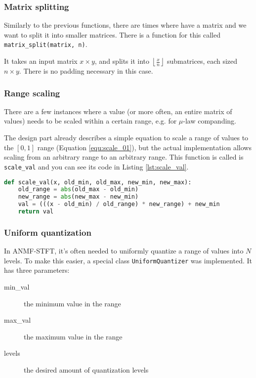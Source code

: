 \subsubsection{Matrix splitting}
Similarly to the previous functions, there are times where have a matrix and we want to split it into smaller matrices. There is a function for this called \verb|matrix_split(matrix, n)|.

It takes an input matrix $x \times y$, and splits it into $\left\lfloor \frac{x}{n} \right\rfloor$ submatrices, each sized $n \times y$. There is no padding necessary in this case.

\subsubsection{Range scaling}
There are a few instances where a value (or more often, an entire matrix of values) needs to be scaled within a certain range, e.g. for $\mu$-law companding.

The design part already describes a simple equation to scale a range of values to the $[0,1]$ range (Equation \ref{equ:scale_01}), but the actual implementation allows scaling from an arbitrary range to an arbitrary range. This function is called is \verb|scale_val| and you can see its code in Listing \ref{lst:scale_val}.

\begin{lstlisting}[caption={Function for scaling value ranges}, label={lst:scale_val}, language=Python]
def scale_val(x, old_min, old_max, new_min, new_max):
	old_range = abs(old_max - old_min)
	new_range = abs(new_max - new_min)
	val = (((x - old_min) / old_range) * new_range) + new_min
	return val
\end{lstlisting}

\subsubsection{Uniform quantization}
In ANMF-STFT, it's often needed to uniformly quantize a range of values into $N$ levels. To make this easier, a special class \verb|UniformQuantizer| was implemented. It has three parameters:

\begin{description}
	\item[min\_val] the minimum value in the range
	\item[max\_val] the maximum value in the range
	\item[levels] the desired amount of quantization levels
\end{description}

